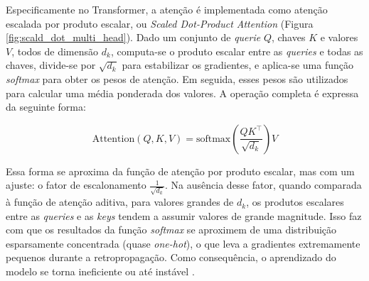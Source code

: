 \begin{figure}[h!]
    \centering
\end{figure}


Especificamente no Transformer, a atenção é implementada como atenção escalada por produto escalar, ou \textit{Scaled Dot-Product Attention} (Figura \ref{fig:scald_dot_multi_head}). Dado um conjunto de \textit{querie} $Q$, chaves $K$ e valores $V$, todos de dimensão $d_k$, computa-se o produto escalar entre as \textit{queries} e todas as chaves, divide-se por $\sqrt{d_k}$ para estabilizar os gradientes, e aplica-se uma função \textit{softmax} para obter os pesos de atenção. Em seguida, esses pesos são utilizados para calcular uma média ponderada dos valores. A operação completa é expressa da seguinte forma:

\begin{equation}
\text{Attention}(Q, K, V) = \text{softmax} \left( \frac{QK^\top}{\sqrt{d_k}} \right) V
\end{equation}

Essa forma se aproxima da função de atenção por produto escalar, mas com um ajuste: o fator de escalonamento \( \frac{1}{\sqrt{d_k}} \). Na ausência desse fator, quando comparada à função de atenção aditiva, para valores grandes de \( d_k \), os produtos escalares entre as \textit{queries} e as \textit{keys} tendem a assumir valores de grande magnitude. Isso faz com que os resultados da função \textit{softmax} se aproximem de uma distribuição esparsamente concentrada (quase \textit{one-hot}), o que leva a gradientes extremamente pequenos durante a retropropagação. Como consequência, o aprendizado do modelo se torna ineficiente ou até instável \cite{vaswani_attention_2017}.

